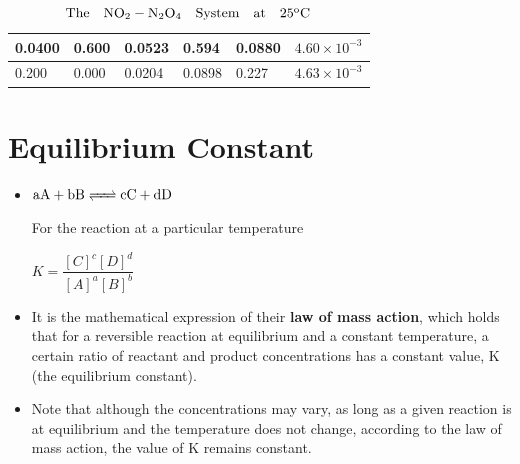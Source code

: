 \documentclass[a4paper,12pt,twocolumn]{article}
\begin{document}
\begin{table}[h!]
\begin{tabular}{|p{1.1cm}|p{1.1cm}|p{1.1cm}|p{1.1cm}|p{1cm}|p{2cm}|}
        \hline 0.0400                      & 0.600                                      & 0.0523                         & 0.594                                      & 0.0880                                                                       & $4.60 \times 10^{-3}$                                                          \\
        \hline 0.200                       & 0.000                                      & 0.0204                         & 0.0898                                     & 0.227                                                                        & $4.63 \times 10^{-3}$                                                          \\
        \hline
    \end{tabular}
    \caption{$\mathrm{The \quad \ce{NO2 - N2O4} \quad System \quad at \quad 25^oC}$}
\end{table}

\section{Equilibrium Constant}
\begin{itemize}
    \item 
          \begin{center} $\ce{aA + bB <=> cC + dD}$ \end{center}
          For the reaction at a particular temperature
          \begin{center}
            $K = \dfrac{[C]^c[D]^d}{[A]^a[B]^b}$
          \end{center}
    \item It is the mathematical expression of their \textbf{law of mass action}, which holds that for a reversible reaction at equilibrium and a constant temperature, a certain ratio of reactant and product concentrations has a constant value, K (the equilibrium constant).
    \item Note that although the concentrations may vary, as long as a given reaction is at equilibrium and the temperature does not change, according to the law of mass action, the value of K remains constant.
\end{itemize}
\end{document}
